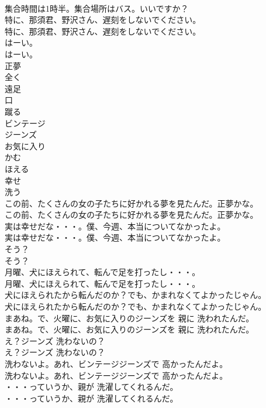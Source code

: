\documentclass[8pt]{extreport}
\begin{document}
\begin{CJK}{UTF8}{min}
\\	集合時間は1時半。集合場所はバス。いいですか？ 
\\	特に、那須君、野沢さん、遅刻をしないでください。	
\\	特に、那須君、野沢さん、遅刻をしないでください。 
\\	はーい。	
\\	はーい。 
\\	正夢
\\	全く
\\	遠足
\\	口
\\	蹴る
\\	ビンテージ
\\	ジーンズ
\\	お気に入り
\\	かむ
\\	ほえる
\\	幸せ
\\	洗う
\\	この前、たくさんの女の子たちに好かれる夢を見たんだ。正夢かな。	
\\	この前、たくさんの女の子たちに好かれる夢を見たんだ。正夢かな。 
\\	実は幸せだな・・・。僕、今週、本当についてなかったよ。	
\\	実は幸せだな・・・。僕、今週、本当についてなかったよ。 
\\	そう？	
\\	そう？ 
\\	月曜、犬にほえられて、転んで足を打ったし・・・。	
\\	月曜、犬にほえられて、転んで足を打ったし・・・。 
\\	犬にほえられたから転んだのか？でも、かまれなくてよかったじゃん。	
\\	犬にほえられたから転んだのか？でも、かまれなくてよかったじゃん。 
\\	まあね。で、火曜に、お気に入りのジーンズを 親に 洗われたんだ。	
\\	まあね。で、火曜に、お気に入りのジーンズを 親に 洗われたんだ。 
\\	え？ジーンズ 洗わないの？	
\\	え？ジーンズ 洗わないの？ 
\\	洗わないよ。あれ、ビンテージジーンズで 高かったんだよ。	
\\	洗わないよ。あれ、ビンテージジーンズで 高かったんだよ。 
\\	・・・っていうか、親が 洗濯してくれるんだ。	
\\	・・・っていうか、親が 洗濯してくれるんだ。 

\end{CJK}
\end{document}
